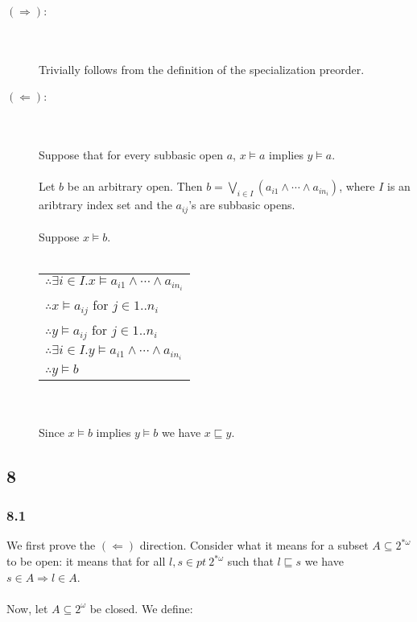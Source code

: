 \documentclass{article}
\begin{document}
\begin{description}

\item[$(\Rightarrow)$:]~\\~\\
Trivially follows from the definition of the specialization preorder.

\item[$(\Leftarrow)$:]~\\~\\
Suppose that for every subbasic open $a$, $x \vDash a$ implies $y \vDash a$.\\~\\
Let $b$ be an arbitrary open. Then $b = \bigvee_{i \in I} (a_{i1} \wedge \cdots \wedge a_{i n_i})$, where
$I$ is an aribtrary index set and the $a_{ij}$'s are subbasic opens.\\~\\
Suppose $x \vDash b$.\\~\\
\begin{tabular}{l}
$\therefore \exists i \in I. x \vDash a_{i1} \wedge \cdots \wedge a_{i n_i}$ \\
$\therefore x \vDash a_{i j}$ for $j \in 1..n_i$ \\
$\therefore y \vDash a_{i j}$ for $j \in 1..n_i$ \\
$\therefore \exists i \in I. y \vDash a_{i1} \wedge \cdots \wedge a_{i n_i}$ \\
$\therefore y \vDash b$ \\
\end{tabular}~\\~\\
Since $x \vDash b$ implies $y \vDash b$ we have $x \sqsubseteq y$.
\end{description}

\subsection*{8}

\subsubsection*{8.1}
We first prove the $(\Leftarrow)$ direction. Consider what it means for a subset $A \subseteq 2^{* \omega}$ to be open: it means that for all $l,s \in \mathit{pt}~2^{* \omega}$ such that $l \sqsubseteq s$
we have $s \in A \Rightarrow l \in A$.\\~\\
Now, let $A \subseteq 2^{\omega}$ be closed. We define:\\~\\
\end{document}
